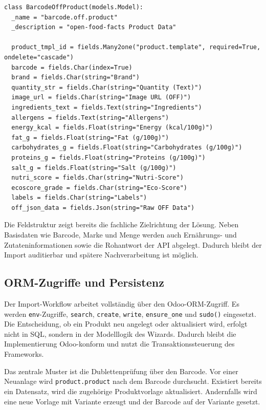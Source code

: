 \documentclass[12pt,a4paper]{article}
\begin{document}
\begin{lstlisting}[caption={Persistentes Modell für Open-Food-Facts-Daten}, label={lst:off-product-model}]
class BarcodeOffProduct(models.Model):
  _name = "barcode.off.product"
  _description = "open-food-facts Product Data"

  product_tmpl_id = fields.Many2one("product.template", required=True, ondelete="cascade")
  barcode = fields.Char(index=True)
  brand = fields.Char(string="Brand")
  quantity_str = fields.Char(string="Quantity (Text)")
  image_url = fields.Char(string="Image URL (OFF)")
  ingredients_text = fields.Text(string="Ingredients")
  allergens = fields.Text(string="Allergens")
  energy_kcal = fields.Float(string="Energy (kcal/100g)")
  fat_g = fields.Float(string="Fat (g/100g)")
  carbohydrates_g = fields.Float(string="Carbohydrates (g/100g)")
  proteins_g = fields.Float(string="Proteins (g/100g)")
  salt_g = fields.Float(string="Salt (g/100g)")
  nutri_score = fields.Char(string="Nutri-Score")
  ecoscore_grade = fields.Char(string="Eco-Score")
  labels = fields.Char(string="Labels")
  off_json_data = fields.Json(string="Raw OFF Data")
\end{lstlisting}

Die Feldstruktur zeigt bereits die fachliche Zielrichtung der Lösung. Neben Basisdaten wie Barcode, Marke und Menge werden auch Ernährungs- und Zutateninformationen sowie die Rohantwort der API abgelegt. Dadurch bleibt der Import auditierbar und spätere Nachverarbeitung ist möglich.

\subsection{ORM-Zugriffe und Persistenz}

Der Import-Workflow arbeitet vollständig über den Odoo-ORM-Zugriff. Es werden \texttt{env}-Zugriffe, \texttt{search}, \texttt{create}, \texttt{write}, \texttt{ensure\_one} und \texttt{sudo()} eingesetzt. Die Entscheidung, ob ein Produkt neu angelegt oder aktualisiert wird, erfolgt nicht in SQL, sondern in der Modelllogik des Wizards. Dadurch bleibt die Implementierung Odoo-konform und nutzt die Transaktionssteuerung des Frameworks.

Das zentrale Muster ist die Dublettenprüfung über den Barcode. Vor einer Neuanlage wird \texttt{product.product} nach dem Barcode durchsucht. Existiert bereits ein Datensatz, wird die zugehörige Produktvorlage aktualisiert. Andernfalls wird eine neue Vorlage mit Variante erzeugt und der Barcode auf der Variante gesetzt.
\end{document}
